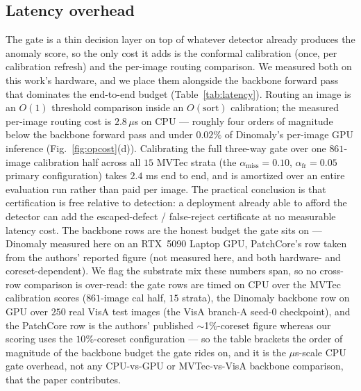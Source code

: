 \documentclass[preprint,11pt]{elsarticle}
\begin{document}
\subsection{Latency overhead}
\label{sec:latency}

The gate is a thin decision layer on top of whatever detector already produces the anomaly score,
so the only cost it adds is the conformal calibration (once, per calibration refresh) and the
per-image routing comparison. We measured both on this work's hardware, and we place them
alongside the backbone forward pass that dominates the end-to-end budget
(Table~\ref{tab:latency}). Routing an image is an $O(1)$ threshold comparison inside an
$O(\text{sort})$ calibration; the measured per-image routing cost is $2.8\,\mu$s on CPU ---
roughly four orders of magnitude below the backbone forward pass and under $0.02\%$ of Dinomaly's
per-image GPU inference (Fig.~\ref{fig:opcost}(d)). Calibrating the full three-way gate over one $861$-image calibration half
across all $15$ MVTec strata (the $\alpha_{\text{miss}}=0.10$, $\alpha_{\text{fr}}=0.05$ primary
configuration) takes $2.4$ ms end to end, and is amortized over an entire evaluation run rather
than paid per image. The practical conclusion is that certification is free relative to detection:
a deployment already able to afford the detector can add the escaped-defect / false-reject
certificate at no measurable latency cost. The backbone rows are the honest budget the gate sits
on --- Dinomaly measured here on an RTX~5090 Laptop GPU, PatchCore's row taken from the authors'
reported figure (not measured here, and both hardware- and coreset-dependent). We flag the
substrate mix these numbers span, so no cross-row comparison is over-read: the gate rows are timed
on CPU over the MVTec calibration scores ($861$-image cal half, $15$ strata), the Dinomaly backbone
row on GPU over $250$ real VisA test images (the VisA branch-A seed-$0$ checkpoint), and the
PatchCore row is the authors' published $\sim$1\%-coreset figure whereas our scoring uses the
$10\%$-coreset configuration --- so the table brackets the order of magnitude of the
backbone budget the gate rides on, and it is the $\mu$s-scale CPU gate overhead, not any
CPU-vs-GPU or MVTec-vs-VisA backbone comparison, that the paper contributes.
\end{document}
